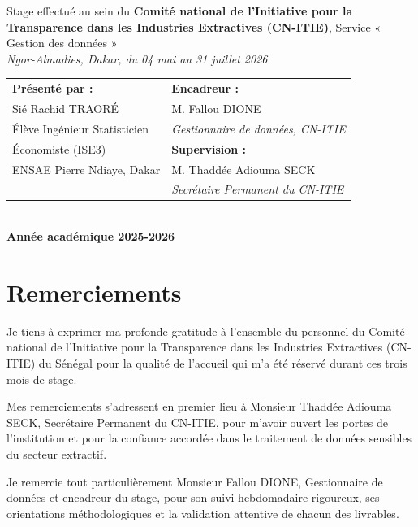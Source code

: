 \documentclass[12pt, a4paper]{article}
\begin{document}
\begin{titlepage}
\begin{center}
    {\normalsize Stage effectué au sein du \textbf{Comité national de l'Initiative pour la
    Transparence dans les Industries Extractives (CN-ITIE)}, Service « Gestion des données »}\\[0.3cm]
    {\normalsize\itshape Ngor-Almadies, Dakar, du 04 mai au 31 juillet 2026}\\[1.1cm]

    \begin{tabular}{p{}p{}}
      \textbf{Présenté par :} & \textbf{Encadreur :}\\[0.15cm]
      Sié Rachid TRAORÉ & M. Fallou DIONE\\
      Élève Ingénieur Statisticien & \emph{Gestionnaire de données, CN-ITIE}\\[0.15cm]
      Économiste (ISE3) & \textbf{Supervision :}\\[0.15cm]
      ENSAE Pierre Ndiaye, Dakar & M. Thaddée Adiouma SECK\\
      & \emph{Secrétaire Permanent du CN-ITIE}\\
    \end{tabular}\\[1.2cm]

    {\color{ensaeblue}\bfseries Année académique 2025-2026}
  \end{center}
\end{titlepage}

\pagestyle{plain}
\setcounter{page}{1}

\section*{Remerciements}

Je tiens à exprimer ma profonde gratitude à l'ensemble du personnel du Comité
national de l'Initiative pour la Transparence dans les Industries Extractives
(CN-ITIE) du Sénégal pour la qualité de l'accueil qui m'a été réservé durant ces
trois mois de stage.

Mes remerciements s'adressent en premier lieu à Monsieur Thaddée Adiouma
SECK, Secrétaire Permanent du CN-ITIE, pour m'avoir ouvert les portes de
l'institution et pour la confiance accordée dans le traitement de données
sensibles du secteur extractif.

Je remercie tout particulièrement Monsieur Fallou DIONE, Gestionnaire de
données et encadreur du stage, pour son suivi hebdomadaire rigoureux, ses
orientations méthodologiques et la validation attentive de chacun des livrables.
\end{document}
